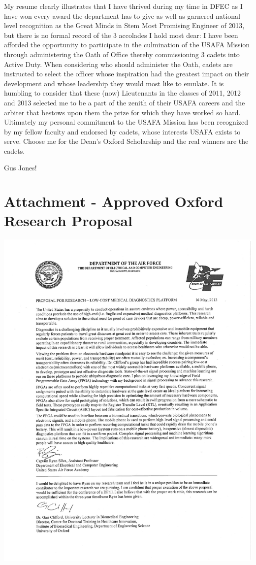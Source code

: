 \documentclass{article}
\begin{document}
My resume clearly illustrates that I have thrived during my time in DFEC as I
have won every award the department has to give as well as garnered national
level recognition as the Great Minds in Stem Most Promising Engineer of 2013,
but there is no formal record of the 3 accolades I hold most dear: I have been
afforded the opportunity to participate in the culmination of the USAFA Mission
through administering the Oath of Office thereby commissioning 3 cadets into
Active Duty. When considering who should administer the Oath, cadets are
instructed to select the officer whose inspiration had the greatest impact on
their development and whose leadership they would most like to emulate. It is
humbling to consider that these (now) Lieutenants in the classes of 2011, 2012
and 2013 selected me to be a part of the zenith of their USAFA careers and the
arbiter that bestows upon them the prize for which they have worked so hard.
Ultimately my personal commitment to the USAFA Mission has been recognized by
my fellow faculty and endorsed by cadets, whose interests USAFA exists to
serve. Choose me for the Dean's Oxford Scholarship and the real winners are the
cadets.

Gus Jones!

\newpage
\section{Attachment - Approved Oxford Research Proposal}
\label{sec:prop}
\centering
\includegraphics[scale=.85,clip=true,trim=1in .5in 1cm 0.4in]{MFR_ProposalforResearch_SilvaSIGNED.pdf}
\end{document}

